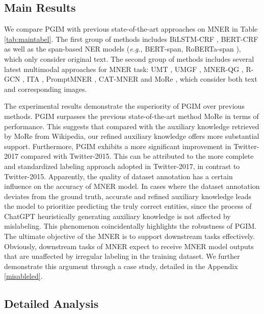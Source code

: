 \documentclass[11pt]{article}
\begin{document}
\subsection{Main Results}
\label{MainResults}
We compare PGIM with previous state-of-the-art approaches on MNER in Table \ref{tab:maintabel}. The first group of methods includes BiLSTM-CRF \citep{huang2015bidirectional},
BERT-CRF \citep{devlin2018bert} as well as the span-based NER models (\emph{e.g.}, BERT-span, RoBERTa-span \citep{yamada2020luke}), which only consider original text. The second group of methods includes several latest multimodal approaches for MNER task: UMT \citep{yu2020improving}, UMGF \citep{zhang2021multi}, MNER-QG \citep{jia2022mner}, R-GCN \citep{zhao2022learning}, ITA \citep{wang2021ita}, PromptMNER \citep{wang2022promptmner}, CAT-MNER \citep{wang2022cat} and MoRe \citep{wang2022named}, which consider both text and corresponding images. 

The experimental results demonstrate the superiority of PGIM over previous methods. PGIM surpasses the previous state-of-the-art method MoRe \citep{wang2022named} in terms of performance. This suggests that compared with the auxiliary knowledge retrieved by MoRe \citep{wang2022named} from Wikipedia, our refined auxiliary knowledge offers more substantial support. Furthermore, PGIM exhibits a more significant improvement in Twitter-2017 compared with Twitter-2015. This can be attributed to the more complete and standardized labeling approach adopted in Twitter-2017, in contrast to Twitter-2015. 
Apparently, the quality of dataset annotation has a certain influence on the accuracy of MNER model. 
In cases where the dataset annotation deviates from the ground truth, 
accurate and refined auxiliary knowledge leads the model to prioritize predicting the truly correct entities, since the process of ChatGPT heuristically generating auxiliary knowledge is not affected by mislabeling. 
This phenomenon coincidentally highlights the robustness of PGIM.  
The ultimate objective of the MNER is to support downstream tasks effectively. Obviously, downstream tasks of MNER expect to receive MNER model outputs that are unaffected by irregular labeling in the training dataset. 
We further demonstrate this argument through a case study, detailed in the Appendix \ref{misableled}.


\subsection{Detailed Analysis}
\end{document}
